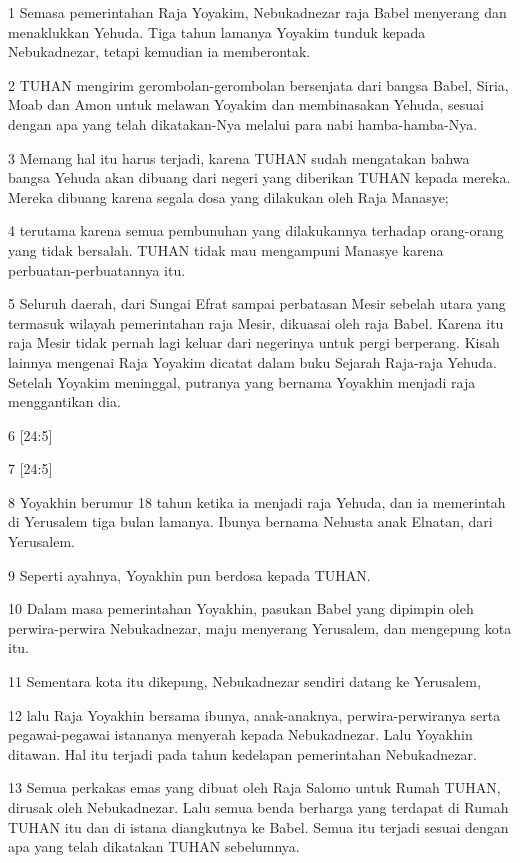 \par 1 Semasa pemerintahan Raja Yoyakim, Nebukadnezar raja Babel menyerang dan menaklukkan Yehuda. Tiga tahun lamanya Yoyakim tunduk kepada Nebukadnezar, tetapi kemudian ia memberontak.
\par 2 TUHAN mengirim gerombolan-gerombolan bersenjata dari bangsa Babel, Siria, Moab dan Amon untuk melawan Yoyakim dan membinasakan Yehuda, sesuai dengan apa yang telah dikatakan-Nya melalui para nabi hamba-hamba-Nya.
\par 3 Memang hal itu harus terjadi, karena TUHAN sudah mengatakan bahwa bangsa Yehuda akan dibuang dari negeri yang diberikan TUHAN kepada mereka. Mereka dibuang karena segala dosa yang dilakukan oleh Raja Manasye;
\par 4 terutama karena semua pembunuhan yang dilakukannya terhadap orang-orang yang tidak bersalah. TUHAN tidak mau mengampuni Manasye karena perbuatan-perbuatannya itu.
\par 5 Seluruh daerah, dari Sungai Efrat sampai perbatasan Mesir sebelah utara yang termasuk wilayah pemerintahan raja Mesir, dikuasai oleh raja Babel. Karena itu raja Mesir tidak pernah lagi keluar dari negerinya untuk pergi berperang. Kisah lainnya mengenai Raja Yoyakim dicatat dalam buku Sejarah Raja-raja Yehuda. Setelah Yoyakim meninggal, putranya yang bernama Yoyakhin menjadi raja menggantikan dia.
\par 6 [24:5]
\par 7 [24:5]
\par 8 Yoyakhin berumur 18 tahun ketika ia menjadi raja Yehuda, dan ia memerintah di Yerusalem tiga bulan lamanya. Ibunya bernama Nehusta anak Elnatan, dari Yerusalem.
\par 9 Seperti ayahnya, Yoyakhin pun berdosa kepada TUHAN.
\par 10 Dalam masa pemerintahan Yoyakhin, pasukan Babel yang dipimpin oleh perwira-perwira Nebukadnezar, maju menyerang Yerusalem, dan mengepung kota itu.
\par 11 Sementara kota itu dikepung, Nebukadnezar sendiri datang ke Yerusalem,
\par 12 lalu Raja Yoyakhin bersama ibunya, anak-anaknya, perwira-perwiranya serta pegawai-pegawai istananya menyerah kepada Nebukadnezar. Lalu Yoyakhin ditawan. Hal itu terjadi pada tahun kedelapan pemerintahan Nebukadnezar.
\par 13 Semua perkakas emas yang dibuat oleh Raja Salomo untuk Rumah TUHAN, dirusak oleh Nebukadnezar. Lalu semua benda berharga yang terdapat di Rumah TUHAN itu dan di istana diangkutnya ke Babel. Semua itu terjadi sesuai dengan apa yang telah dikatakan TUHAN sebelumnya.
